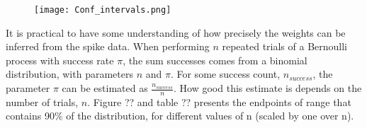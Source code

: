 \begin{figure}[h]
    \centering
    \texttt{[image: Conf\_intervals.png]}
\end{figure}

It is practical to have some understanding of how precisely the weights can be inferred from the spike data. When performing $n$ repeated trials of a Bernoulli process with success rate $\pi$, the sum successes comes from a binomial distribution, with parameters $n$ and $\pi$. For some success count, $n_{success}$, the parameter $\pi$ can be estimated as $\frac{n_{success}}{n}$. How good this estimate is depends on the number of trials, $n$. Figure ?? and table ?? presents the endpoints of range that contains 90\% of the distribution, for different values of n (scaled by one over n). 